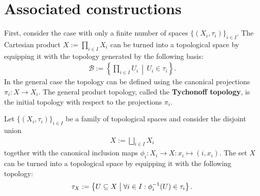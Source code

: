 
\section{Associated constructions}

    \begin{construct}\label{topology:tychonoff_topology}
        First, consider the case with only a finite number of spaces $\{(X_i,\tau_i)\}_{i\in I}$. The Cartesian product $X:=\prod_{i\in I}X_i$ can be turned into a topological space by equipping it with the topology generated by the following basis:
        \begin{gather}
            \mathcal{B} := \left\{\prod_{i\in I}U_i\,\middle\vert\,U_i\in\tau_i\right\}.
        \end{gather}
        In the general case the topology can be defined using the canonical projections $\pi_i:X\rightarrow X_i$. The general product topology, called the \textbf{Tychonoff topology}, is the initial topology with respect to the projections $\pi_i$.
    \end{construct}

    \begin{construct}\label{topology:disjoint_union}
        Let $\{(X_i,\tau_i)\}_{i\in I}$ be a family of topological spaces and consider the disjoint union
        \begin{gather}
            X := \bigsqcup_{i\in I}X_i
        \end{gather}
        together with the canonical inclusion maps $\phi_i:X_i\rightarrow X:x_i\mapsto(i,x_i)$. The set $X$ can be turned into a topological space by equipping it with the following topology:
        \begin{gather}
            \tau_X := \bigl\{U\subseteq X\bigm\vert\forall i\in I:\phi_i^{-1}(U)\in\tau_i\bigr\}\,.
        \end{gather}
    \end{construct}

